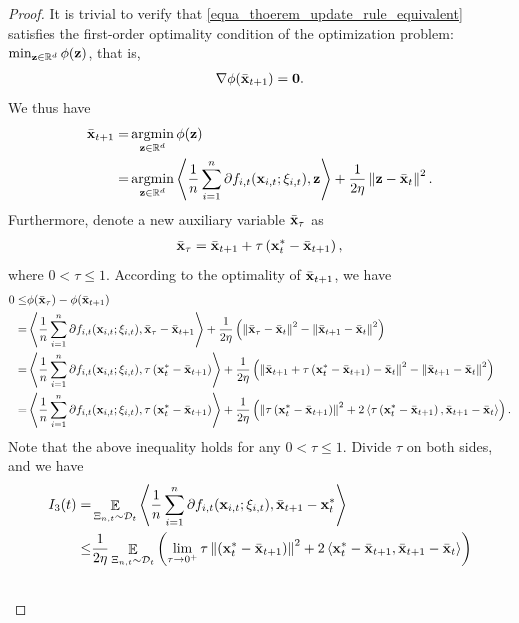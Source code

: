 \documentclass{article}
\begin{document}
\begin{proof}
It is trivial to verify that \eqref{equa_thoerem_update_rule_equivalent} satisfies the first-order optimality condition of the optimization problem: $\min_{{\bf z}\in\mathbb{R}^d} \phi({\bf z})$, that is,
\begin{align}
\nonumber
\nabla \phi(\bar{{\bf x}}_{t+1}) = {\bf 0}.
\end{align} We thus have 
\begin{align}
\nonumber
\bar{\x}_{t+1} = & \argmin_{\z\in\RR^d} \phi(\z) \\ \nonumber
= & \argmin_{\z\in\RR^d} \lrangle{\frac{1}{n}\sum_{i=1}^n \partial f_{i,t}(\x_{i,t};\xi_{i,t}), \z} + \frac{1}{2\eta}\lrnorm{\z - \bar{\x}_t}^2.
\end{align} Furthermore, denote a new auxiliary variable $\bar{{\bf x}}_{\tau}$ as  
\begin{align}
\nonumber
\bar{{\bf x}}_{\tau} = \bar{{\bf x}}_{t+1} + \tau \left( {\bf x}_t^\ast - \bar{{\bf x}}_{t+1} \right),
\end{align} where $0< \tau \le 1$. According to the optimality of $\bar{{\bf x}}_{t+1}$, we have
\begin{align}
\nonumber
0 \le & \phi(\bar{{\bf x}}_{\tau}) - \phi(\bar{{\bf x}}_{t+1}) \\ \nonumber
= & \left\langle\frac{1}{n}\sum_{i=1}^n \partial f_{i,t}({\bf x}_{i,t};\xi_{i,t}), \bar{{\bf x}}_{\tau} - \bar{{\bf x}}_{t+1} \right\rangle + \frac{1}{2\eta}\left(  \left\lVert\bar{{\bf x}}_{\tau} - \bar{{\bf x}}_t\right\rVert^2 - \left\lVert\bar{{\bf x}}_{t+1} - \bar{{\bf x}}_t\right\rVert^2  \right) \\ \nonumber
= & \left\langle\frac{1}{n}\sum_{i=1}^n \partial f_{i,t}({\bf x}_{i,t};\xi_{i,t}), \tau \left( {\bf x}_t^\ast - \bar{{\bf x}}_{t+1} \right) \right\rangle + \frac{1}{2\eta}\left(  \left\lVert\bar{{\bf x}}_{t+1} + \tau \left( {\bf x}_t^\ast - \bar{{\bf x}}_{t+1} \right) - \bar{{\bf x}}_t\right\rVert^2 - \left\lVert\bar{{\bf x}}_{t+1} - \bar{{\bf x}}_t\right\rVert^2  \right) \\ \nonumber
= & \left\langle\frac{1}{n}\sum_{i=1}^n \partial f_{i,t}({\bf x}_{i,t};\xi_{i,t}), \tau \left( {\bf x}_t^\ast - \bar{{\bf x}}_{t+1} \right) \right\rangle + \frac{1}{2\eta}\left(  \left\lVert\tau \left( {\bf x}_t^\ast - \bar{{\bf x}}_{t+1} \right)\right\rVert^2 + 2\left\langle\tau \left( {\bf x}_t^\ast - \bar{{\bf x}}_{t+1} \right), \bar{{\bf x}}_{t+1} - \bar{{\bf x}}_t  \right\rangle  \right).
\end{align} Note that the above inequality holds for any $0< \tau \le 1$. Divide $\tau$ on both sides, and we have
\begin{align}
\nonumber
I_3(t) = & \EE_{ \Xi_{n,t} \sim \Dcal_{t} } \lrangle{\frac{1}{n}\sum_{i=1}^n \partial f_{i,t}(\x_{i,t};\xi_{i,t}), \bar{\x}_{t+1} - \x_t^\ast} \\ \nonumber 
\le & \frac{1}{2\eta}\EE_{ \Xi_{n,t} \sim \Dcal_{t} }\lrincir{ \lim_{\tau \rightarrow 0^+}\tau \lrnorm{\lrincir{\x_t^\ast - \bar{\x}_{t+1}}}^2 + 2\lrangle{ \x_t^\ast - \bar{\x}_{t+1}, \bar{\x}_{t+1} - \bar{\x}_t } } \\ \nonumber

\end{align}
\end{proof}
\end{document}
